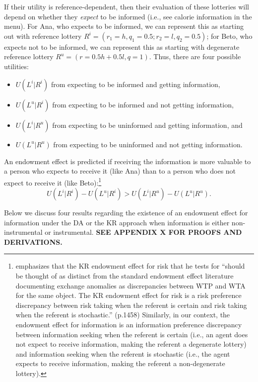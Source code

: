 \documentclass[12pt]{article}
\begin{document}
If their utility is reference-dependent, then their evaluation of these lotteries will depend on whether they \emph{expect} to be informed (i.e., see calorie information in the menu). For Ana, who expects to be informed, we can represent this as starting out with reference lottery $R^i=(r_1=h,q_1=0.5;r_2=l,q_2=0.5)$; for Beto, who expects not to be informed, we can represent this as starting with degenerate reference lottery $R^u=(r=0.5h+0.5l,q=1)$. Thus, there are four possible utilities:
\begin{itemize}
	\item $U(L^i|R^i)$ from expecting to be informed and getting information,
	\item $U(L^u|R^i)$ from expecting to be informed and not getting information,
	\item $U(L^i|R^u)$ from expecting to be uninformed and getting information, and
  \item $U(L^u|R^u)$ from expecting to be uninformed and not getting information.
\end{itemize}

An endowment effect is predicted if receiving the information is more valuable to a person who expects to receive it (like Ana) than to a person who does not expect to receive it (like Beto):\footnote{\citet{sprengerEndowmentEffectRisk2015} emphasizes that the KR endowment effect for risk that he tests for \enquote{should be thought of as distinct from the standard endowment effect literature documenting exchange anomalies as discrepancies between WTP and WTA for the same object. The KR endowment effect for risk is a risk preference discrepancy between risk taking when the referent is certain and risk taking when the referent is stochastic.} (p.1458) Similarly, in our context, the endowment effect for information is an information preference discrepancy between information seeking when the referent is certain (i.e., an agent does not expect to receive information, making the referent a degenerate lottery) and information seeking when the referent is stochastic (i.e., the agent expects to receive information, making the referent a non-degenerate lottery).}
\begin{equation}
  U(L^i|R^i)-U(L^u|R^i)>U(L^i|R^u)-U(L^u|R^u).
  \label{eq:endowmentEffect}
\end{equation}

Below we discuss four results regarding the existence of an endowment effect for information under the DA or the KR approach when information is either non-instrumental or instrumental. \textbf{SEE APPENDIX X FOR PROOFS AND DERIVATIONS.}
\end{document}
